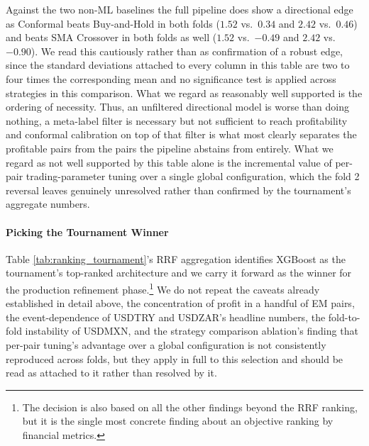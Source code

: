 \documentclass[12pt, a4paper]{article}
\begin{document}
\medskip

Against the two non-ML baselines the full pipeline does show a directional edge as Conformal beats Buy-and-Hold in both folds ($1.52$ vs.\ $0.34$ and $2.42$ vs.\ $0.46$) and beats 
SMA Crossover in both folds as well ($1.52$ vs.\ $-0.49$ and $2.42$ vs.\ $-0.90$). We read this cautiously rather than as confirmation of a robust edge, since the standard deviations 
attached to every column in this table are two to four times the corresponding mean and no significance test is applied across strategies in this comparison. What we regard 
as reasonably well supported is the ordering of necessity. Thus, an unfiltered directional model is worse than doing nothing, a meta-label filter is necessary but not sufficient to 
reach profitability and conformal calibration on top of that filter is what most clearly separates the profitable pairs from the pairs the pipeline abstains from entirely. What 
we regard as not well supported by this table alone is the incremental value of per-pair trading-parameter tuning over a single global configuration, which the fold 2 reversal 
leaves genuinely unresolved rather than confirmed by the tournament's aggregate numbers.


\paragraph{Picking the Tournament Winner}\hspace{0pt}

Table \ref{tab:ranking_tournament}'s RRF aggregation identifies XGBoost as the tournament's top-ranked architecture and we carry it forward as the winner for the production 
refinement phase.\footnote{The decision is also based on all the other findings beyond the RRF ranking, but it is the single most concrete finding about an objective ranking by financial metrics.} 
We do not repeat the caveats already established in detail above, the concentration of profit in a handful of EM pairs, the event-dependence of USDTRY and 
USDZAR's headline numbers, the fold-to-fold instability of USDMXN, and the strategy comparison ablation's finding that per-pair tuning's advantage over a global configuration 
is not consistently reproduced across folds, but they apply in full to this selection and should be read as attached to it rather than resolved by it.

\medskip
\end{document}
